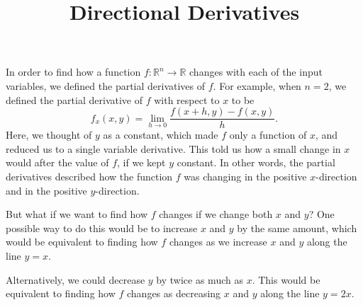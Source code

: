 \documentclass{ximera}
\title{Directional Derivatives}
\begin{document}
\begin{abstract}
\end{abstract}
\maketitle

In order to find how a function $f:\mathbb{R}^n\rightarrow\mathbb{R}$ changes with each of the input variables, we defined the partial derivatives of $f$. For example, when $n=2$, we defined the partial derivative of $f$ with respect to $x$ to be
\[
f_x(x,y)=\lim_{h\rightarrow 0}\frac{f(x+h,y)-f(x,y)}{h}.
\]
Here, we thought of $y$ as a constant, which made $f$ only a function of $x$, and reduced us to a single variable derivative. This told us how a small change in $x$ would after the value of $f$, if we kept $y$ constant. In other words, the partial derivatives described how the function $f$ was changing in the positive $x$-direction and in the positive $y$-direction.

\begin{image}
\end{image}

But what if we want to find how $f$ changes if we change both $x$ and $y$? One possible way to do this would be to increase $x$ and $y$ by the same amount, which would be equivalent to finding how $f$ changes as we increase $x$ and $y$ along the line $y=x$.

\begin{image}
\end{image}

Alternatively, we could decrease $y$ by twice as much as $x$. This would be equivalent to finding how $f$ changes as decreasing $x$ and $y$ along the line $y=2x$.

\begin{image}
\end{image}
\end{document}
